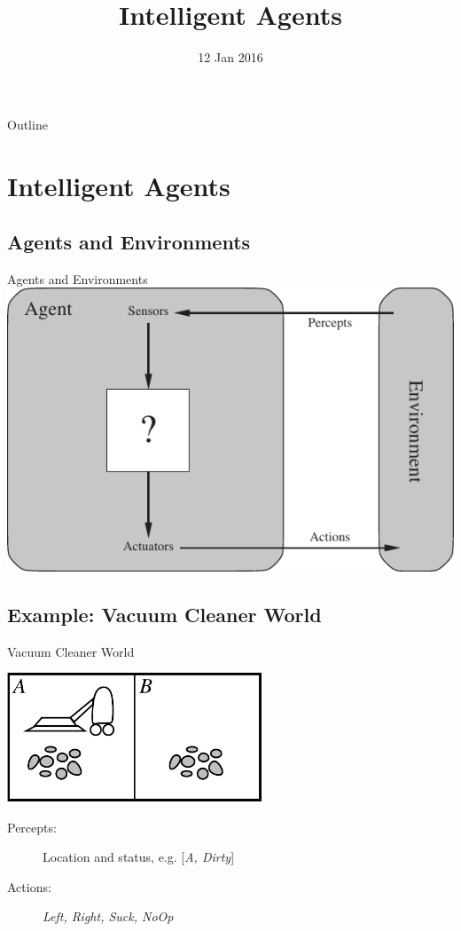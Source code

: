 \documentclass[14pt]{beamer}
\title{Intelligent Agents}
\date[]{12 Jan 2016}
\begin{document}
\begin{frame}
  \titlepage
\end{frame}

\begin{frame}{Outline}
  \tableofcontents
\end{frame}

\section{Intelligent Agents}
\subsection{Agents and Environments}

\begin{frame}{Agents and Environments}
\includegraphics[width=\textwidth]{agent-environment.pdf}
\end{frame}

\subsection{Example: Vacuum Cleaner World}

\begin{frame}{Vacuum Cleaner World}
\begin{center}
\includegraphics[width=3in]{vacuum-environment.pdf}
\end{center}
\begin{description}
\item[Percepts:] Location and status, e.g. [\textit{A, Dirty}]
\item[Actions:] \textit{Left, Right, Suck, NoOp}
\end{description}
\end{frame}
\end{document}
